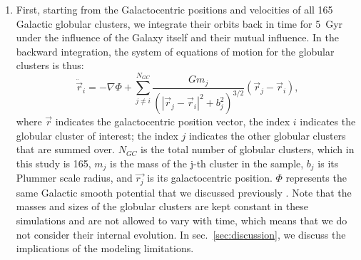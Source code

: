 \documentclass{aa}
\begin{document}
      \begin{enumerate}
          \item First, starting from the Galactocentric positions and velocities of all 165 Galactic globular clusters, we integrate their orbits back in time for 5~Gyr under the influence of the Galaxy itself and their mutual influence. In the backward integration, the system of equations of motion for the globular clusters is thus: 
          \begin{equation}
          \ddot{\vec{r}}_i = -\nabla \Phi + \left.\sum_{j\neq i}^{N_{GC}} \frac{Gm_j}{\left(|\vec{r}_j - \vec{r}_i|^2 + b_j^2\right)^{3/2}}\right. \left(\vec{r}_j - \vec{r}_i\right),
          \end{equation}\label{eq:GCNBody} 
          \noindent where $\vec{r}$ indicates the galactocentric position vector, the index $i$ indicates the globular cluster of interest; the index $j$ indicates the other globular clusters that are summed over. $N_{GC}$ is the total number of globular clusters, which in this study is 165, $m_j$ is the mass of the j-th cluster in the sample, $b_j$ is its Plummer scale radius, and $\vec{r_j}$ is its galactocentric position. $\Phi$ represents the same Galactic smooth potential that we discussed previously \citep[][Model~II, in the present case]{2017A&A...598A..66P}. Note that the masses and sizes of the globular clusters are kept constant in these simulations and are not allowed to vary with time, which means that we do not consider their internal evolution. In sec.~\ref{sec:discussion}, we discuss the implications of the modeling limitations.
      

\end{enumerate}
\end{document}
